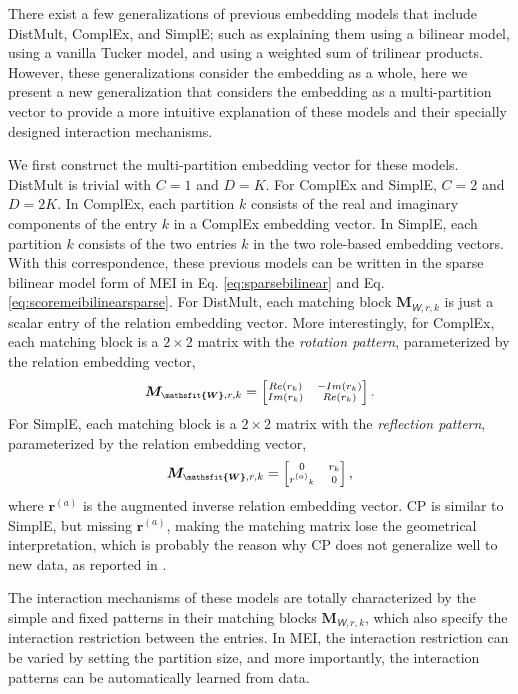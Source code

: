 \documentclass{ecai}
\def\vr{{\bm{r}}}
\def\mM{{\bm{M}}}
\newcommand{\tens}[1]{\bm{\mathsfit{#1}}}
\def\tW{{\tens{W}}}
\theoremstyle{plain}  \newtheorem{thm}{Theorem}  \newtheorem{lem}[thm]{Lemma}  \newtheorem{prop}[thm]{Proposition}
\theoremstyle{remark}  \newtheorem*{rem}{Remark}
\begin{document}
There exist a few generalizations of previous embedding models that include DistMult, ComplEx, and SimplE; such as \cite{kazemi_simpleembeddinglink_2018} explaining them using a bilinear model, \cite{balazevic_tuckertensorfactorization_2019} using a vanilla Tucker model, and \cite{tran_analyzingknowledgegraph_2019} using a weighted sum of trilinear products. However, these generalizations consider the embedding as a whole, here we present a new generalization that considers the embedding as a multi-partition vector to provide a more intuitive explanation of these models and their specially designed interaction mechanisms. 

We first construct the multi-partition embedding vector for these models. DistMult is trivial with $ C = 1 $ and $ D = K $. For ComplEx and SimplE, $ C = 2 $ and $ D = 2K $. In ComplEx, each partition $ k $ consists of the real and imaginary components of the entry $ k $ in a ComplEx embedding vector. In SimplE, each partition $ k $ consists of the two entries $ k $ in the two role-based embedding vectors. With this correspondence, these previous models can be written in the sparse bilinear model form of MEI in Eq. \ref{eq:sparsebilinear} and Eq. \ref{eq:scoremeibilinearsparse}. For DistMult, each matching block $ \mM_{\tW, r, k} $ is just a scalar entry of the relation embedding vector. More interestingly, for ComplEx, each matching block is a $ 2 \times 2 $ matrix with the \textit{rotation pattern}, parameterized by the relation embedding vector, \[ \small \textstyle \mM_{\tW, r, k} = \scriptsize \begin{bmatrix} Re(r_k) & - Im(r_k) \\ Im(r_k) & Re(r_k) \end{bmatrix}. \] For SimplE, each matching block is a $ 2 \times 2 $ matrix with the \textit{reflection pattern}, parameterized by the relation embedding vector, \[ \small \textstyle \mM_{\tW, r, k} = \scriptsize \begin{bmatrix} 0 & r_k \\ {r^{(a)}}_k & 0 \end{bmatrix}, \] where $ \vr^{(a)} $ is the augmented inverse relation embedding vector. CP \cite{hitchcock_expressiontensorpolyadic_1927} is similar to SimplE, but missing $ \vr^{(a)} $, making the matching matrix lose the geometrical interpretation, which is probably the reason why CP does not generalize well to new data, as reported in \cite{tran_analyzingknowledgegraph_2019}. 

The interaction mechanisms of these models are totally characterized by the simple and fixed patterns in their matching blocks $ \mM_{\tW, r, k} $, which also specify the interaction restriction between the entries. In MEI, the interaction restriction can be varied by setting the partition size, and more importantly, the interaction patterns can be automatically learned from data.
\end{document}

